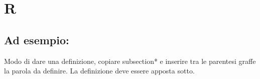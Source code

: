 \section*{R}
\markright{}
\subsection*{Ad esempio:}
Modo di dare una definizione, copiare subsection*{} e inserire tra le parentesi graffe la parola da definire. La definizione deve essere apposta sotto.